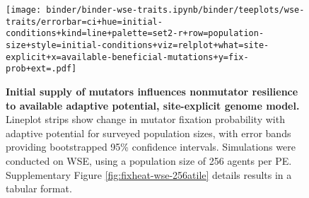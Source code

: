 \begin{figure}[h]
\begin{minipage}{0.6\textwidth}
  \texttt{[image: binder/binder-wse-traits.ipynb/binder/teeplots/wse-traits/errorbar=ci+hue=initial-conditions+kind=line+palette=set2-r+row=population-size+style=initial-conditions+viz=relplot+what=site-explicit+x=available-beneficial-mutations+y=fix-prob+ext=.pdf]}%
\end{minipage}%
\begin{minipage}{0.4\textwidth}
  \caption{
  \textbf{Initial supply of mutators influences nonmutator resilience to available adaptive potential, site-explicit genome model.}
  \footnotesize
  Lineplot strips show change in mutator fixation probability with adaptive potential for surveyed population sizes, with error bands providing bootstrapped 95\% confidence intervals.
  Simulations were conducted on WSE, using a population size of 256 agents per PE.
  Supplementary Figure \ref{fig:fixheat-wse-256atile} details results in a tabular format.
    }
    \label{fig:denovo-5050-conditions-combined-site-explicit}
  \end{minipage}
\end{figure}
